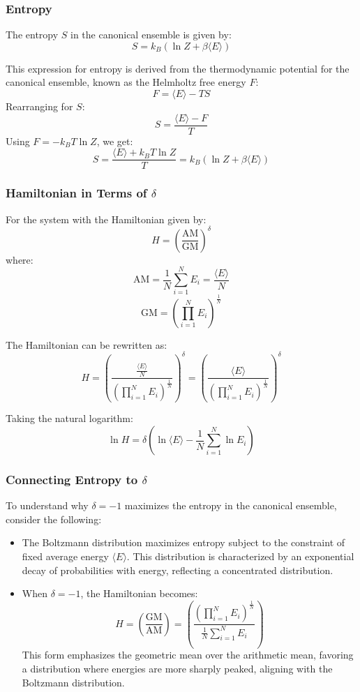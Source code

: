 \documentclass{article}
\begin{document}
\subsubsection{Entropy}

The entropy \(S\) in the canonical ensemble is given by:
\[
S = k_B \left( \ln Z + \beta \langle E \rangle \right)
\]

This expression for entropy is derived from the thermodynamic potential for the canonical ensemble, known as the Helmholtz free energy \(F\):
\[
F = \langle E \rangle - TS
\]
Rearranging for \(S\):
\[
S = \frac{\langle E \rangle - F}{T}
\]
Using \(F = -k_B T \ln Z\), we get:
\[
S = \frac{\langle E \rangle + k_B T \ln Z}{T} = k_B \left( \ln Z + \beta \langle E \rangle \right)
\]

\subsubsection{Hamiltonian in Terms of \(\delta\)}

For the system with the Hamiltonian given by:
\[
H = \left( \frac{\text{AM}}{\text{GM}} \right)^\delta
\]
where:
\[
\text{AM} = \frac{1}{N} \sum_{i=1}^N E_i = \frac{\langle E \rangle}{N}
\]
\[
\text{GM} = \left( \prod_{i=1}^N E_i \right)^{\frac{1}{N}}
\]

The Hamiltonian can be rewritten as:
\[
H = \left( \frac{\frac{\langle E \rangle}{N}}{\left( \prod_{i=1}^N E_i \right)^{\frac{1}{N}}} \right)^\delta = \left( \frac{\langle E \rangle}{\left( \prod_{i=1}^N E_i \right)^{\frac{1}{N}}} \right)^\delta
\]

Taking the natural logarithm:
\[
\ln H = \delta \left( \ln \langle E \rangle - \frac{1}{N} \sum_{i=1}^N \ln E_i \right)
\]

\subsubsection{Connecting Entropy to \(\delta\)}

To understand why \(\delta = -1\) maximizes the entropy in the canonical ensemble, consider the following:

\begin{itemize}
    \item The Boltzmann distribution maximizes entropy subject to the constraint of fixed average energy \(\langle E \rangle\). This distribution is characterized by an exponential decay of probabilities with energy, reflecting a concentrated distribution.
    \item When \(\delta = -1\), the Hamiltonian becomes:
    \[
    H = \left( \frac{\text{GM}}{\text{AM}} \right) = \left( \frac{\left( \prod_{i=1}^N E_i \right)^{\frac{1}{N}}}{\frac{1}{N} \sum_{i=1}^N E_i} \right)
    \]
    This form emphasizes the geometric mean over the arithmetic mean, favoring a distribution where energies are more sharply peaked, aligning with the Boltzmann distribution.
\end{itemize}
\end{document}
